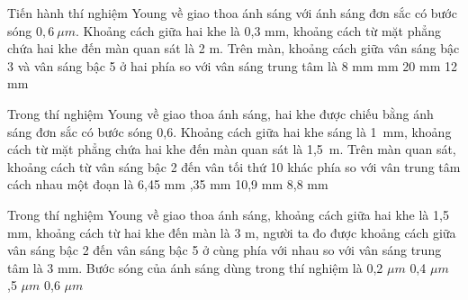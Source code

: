 \begin{vidu}%
 Tiến hành thí nghiệm Young về giao thoa ánh sáng với ánh sáng đơn sắc có bước sóng $0,6\ \mu m$. Khoảng cách giữa hai khe là 0,3 mm, khoảng cách từ mặt phẳng chứa hai khe đến màn quan sát là 2 m. Trên màn, khoảng cách giữa vân sáng bậc 3 và vân sáng bậc 5 ở hai phía so với vân sáng trung tâm là
\choice
{8 mm}
{ mm}
{20 mm}
{12 mm}
\end{vidu} %
\begin{vidu}%
Trong thí nghiệm Young về giao thoa ánh sáng, hai khe được chiếu bằng ánh sáng đơn sắc có bước sóng 0,6\microm. Khoảng cách giữa hai khe sáng là 1\ mm, khoảng cách từ mặt phẳng chứa hai khe đến màn quan sát là 1,5\ m. Trên màn quan sát, khoảng cách từ vân sáng bậc 2 đến vân tối thứ 10 khác phía so với vân trung tâm cách nhau một đoạn là
\choice
{6,45 mm}
{,35 mm}
{10,9 mm}
{8,8 mm}
\end{vidu} %
\begin{vidu}%
Trong thí nghiệm Young về giao thoa ánh sáng, khoảng cách giữa hai khe là 1,5 mm, khoảng cách từ hai khe đến màn là 3 m, người ta đo được khoảng cách giữa vân sáng bậc 2 đến vân sáng bậc 5 ở cùng phía với nhau so với vân sáng trung tâm là 3 mm. Bước sóng của ánh sáng dùng trong thí nghiệm là
\choice
{0,2 $\mu m $}
{0,4 $\mu m $}
{,5 $\mu m $}
{0,6 $\mu m $}
\end{vidu} %
